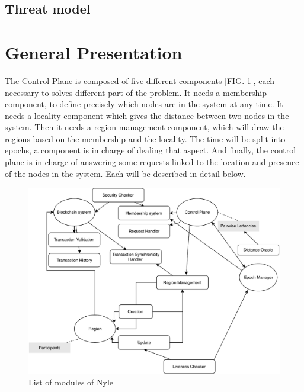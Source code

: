 \documentclass[a4paper,11pt,oneside]{report}
\begin{document}
\subsection{Threat model}



\section{General Presentation}

The Control Plane is composed of five different components [FIG. \ref{fig:modules}], each
necessary to solves different part of the problem. It needs a membership
component, to define precisely which nodes are in the system at any time. It
needs a locality component which gives the distance between two nodes in the
system. Then it needs a region management component, which will draw the
regions based on the membership and the locality. The time will be split into
epochs, a component is in charge of dealing that aspect. And finally, the
control plane is in charge of answering some requests linked to the location
and presence of the nodes in the system. Each will be described in detail
below. 


\begin{figure}[!h] \centering
\includegraphics[width=400pt]{figures/Nyle_components} \caption{List of modules
of Nyle} \label{fig:modules} \end{figure}
\end{document}
